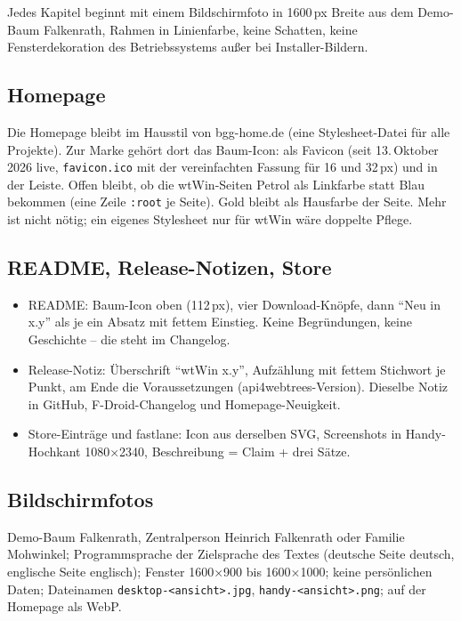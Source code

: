 \documentclass[a4paper, 11pt, parskip=half, headings=small, numbers=noenddot]{scrartcl}
\begin{document}
Jedes Kapitel beginnt mit einem Bildschirmfoto in 1600\,px Breite aus dem Demo-Baum Falkenrath, Rahmen in Linienfarbe, keine Schatten, keine Fensterdekoration des Betriebssystems außer bei Installer-Bildern.

\subsection{Homepage}

Die Homepage bleibt im Hausstil von bgg-home.de (eine Stylesheet-Datei für alle Projekte). Zur Marke gehört dort das Baum-Icon: als Favicon (seit 13.\,Oktober 2026 live, \texttt{favicon.ico} mit der vereinfachten Fassung für 16 und 32\,px) und in der Leiste. Offen bleibt, ob die wtWin-Seiten Petrol als Linkfarbe statt Blau bekommen (eine Zeile \texttt{:root} je Seite). Gold bleibt als Hausfarbe der Seite. Mehr ist nicht nötig; ein eigenes Stylesheet nur für wtWin wäre doppelte Pflege.

\subsection{README, Release-Notizen, Store}

\begin{itemize}
\item README: Baum-Icon oben (112\,px), vier Download-Knöpfe, dann \enquote{Neu in x.y} als je ein Absatz mit fettem Einstieg. Keine Begründungen, keine Geschichte – die steht im Changelog.
\item Release-Notiz: Überschrift \enquote{wtWin x.y}, Aufzählung mit fettem Stichwort je Punkt, am Ende die Voraussetzungen (api4webtrees-Version). Dieselbe Notiz in GitHub, F-Droid-Changelog und Homepage-Neuigkeit.
\item Store-Einträge und fastlane: Icon aus derselben SVG, Screenshots in Handy-Hochkant 1080×2340, Beschreibung = Claim + drei Sätze.
\end{itemize}

\subsection{Bildschirmfotos}

Demo-Baum Falkenrath, Zentralperson Heinrich Falkenrath oder Familie Mohwinkel; Programmsprache der Zielsprache des Textes (deutsche Seite deutsch, englische Seite englisch); Fenster 1600×900 bis 1600×1000; keine persönlichen Daten; Dateinamen \texttt{desktop-<ansicht>.jpg}, \texttt{handy-<ansicht>.png}; auf der Homepage als WebP.
\end{document}
